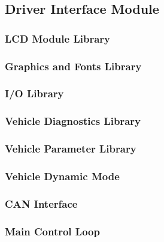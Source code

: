 \subsection{Driver Interface Module}


\subsubsection{LCD Module Library}


\subsubsection{Graphics and Fonts Library}


\subsubsection{I/O Library}


\subsubsection{Vehicle Diagnostics Library}


\subsubsection{Vehicle Parameter Library}


\subsubsection{Vehicle Dynamic Mode}


\subsubsection{CAN Interface}


\subsubsection{Main Control Loop}